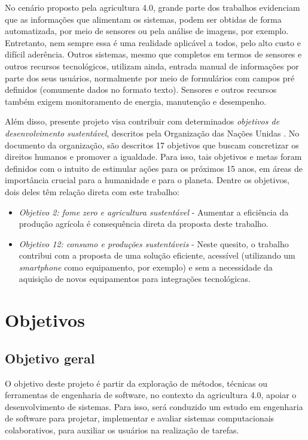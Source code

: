 \documentclass[12pt]{article}
\begin{document}
No cenário proposto pela agricultura 4.0, grande parte dos trabalhos evidenciam que as informações que alimentam os sistemas, podem ser obtidas de forma automatizada, por meio de sensores ou pela análise de imagens, por exemplo. Entretanto, nem sempre essa é uma realidade aplicável a todos, pelo alto custo e difícil aderência. Outros sistemas, mesmo que completos em termos de sensores e outros recursos tecnológicos, utilizam ainda, entrada manual de informações por parte dos seus usuários, normalmente por meio de formulários com campos pré definidos (comumente dados no formato texto). Sensores e outros recursos também exigem monitoramento de energia, manutenção e desempenho.

Além disso, presente projeto visa contribuir com determinados \textit{objetivos de desenvolvimento sustentável}, descritos pela Organização das Nações Unidas \cite{ONU:2020}. No documento da organização, são descritos 17 objetivos que buscam concretizar os direitos humanos e promover a igualdade. Para isso, tais objetivos e metas foram definidos com o intuito de estimular ações para os próximos 15 anos, em áreas de importância crucial para a humanidade e para o planeta. Dentre os objetivos, dois deles têm relação direta com este trabalho:

\begin{itemize}
	\item \textit{Objetivo 2: fome zero e agricultura sustentável} - Aumentar a eficiência da produção agrícola é consequência direta da proposta deste trabalho.
	\item \textit{Objetivo 12: consumo e produções sustentáveis} - Neste quesito, o trabalho contribui com a proposta de uma solução eficiente, acessível (utilizando um \textit{smartphone} como equipamento, por exemplo) e sem a necessidade da aquisição de novos equipamentos para integrações tecnológicas.
\end{itemize}

\section{Objetivos}
\label{sec:objetivos}

\subsection{Objetivo geral}
\label{subsec:objetivo_geral}

O objetivo deste projeto é partir da exploração de métodos, técnicas ou ferramentas de engenharia de software, no contexto da agricultura 4.0, apoiar o desenvolvimento de sistemas. Para isso, será conduzido um estudo em engenharia de software para projetar, implementar e avaliar sistemas computacionais colaborativos, para auxiliar os usuários na realização de tarefas.
\end{document}
